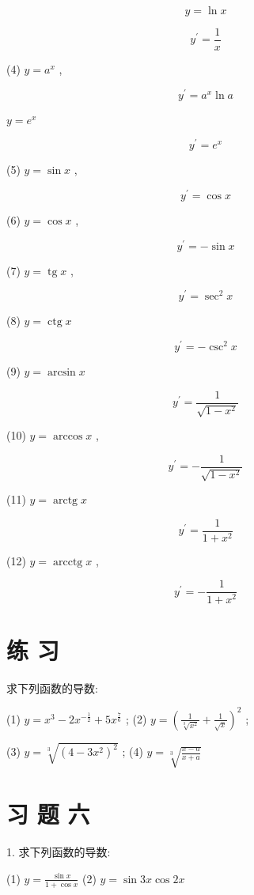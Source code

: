 \documentclass[10pt]{article}
\begin{document}
\[
y = \ln x
\]

\[
{y}^{\prime } = \frac{1}{x}
\]

(4) \(y = {a}^{x}\) ,

\[
{y}^{\prime } = {a}^{x}\ln a
\]

\(y = {e}^{x}\)

\[
{y}^{\prime } = {e}^{x}
\]

(5) \(y = \sin x\) ,

\[
{y}^{\prime } = \cos x
\]

(6) \(y = \cos x\) ,

\[
{y}^{\prime } = - \sin x
\]

(7) \(y = \operatorname{tg}x\) ,

\[
{y}^{\prime } = {\sec }^{2}x
\]

(8) \(y = \operatorname{ctg}x\)

\[
{y}^{\prime } = - {\csc }^{2}x
\]

(9) \(y = \arcsin x\)

\[
{y}^{\prime } = \frac{1}{\sqrt{1 - {x}^{2}}}
\]

(10) \(y = \arccos x\) ,

\[
{y}^{\prime } = - \frac{1}{\sqrt{1 - {x}^{2}}}
\]

(11) \(y = \operatorname{arctg}x\)

\[
{y}^{\prime } = \frac{1}{1 + {x}^{2}}
\]

(12) \(y = \operatorname{arcctg}x\) ,

\[
{y}^{\prime } = - \frac{1}{1 + {x}^{2}}
\]

\section*{练 习}

求下列函数的导数:

(1) \(y = {x}^{3} - 2{x}^{-\frac{1}{2}} + 5{x}^{\frac{7}{6}}\) ; (2) \(y = {\left( \frac{1}{\sqrt[3]{{x}^{2}}} + \frac{1}{\sqrt{x}}\right) }^{2}\) ;

(3) \(y = \sqrt[3]{{\left( 4 - 3{x}^{2}\right) }^{2}}\) ; (4) \(y = \sqrt[3]{\frac{x - a}{x + a}}\)

\section*{习 题 六}

1. 求下列函数的导数:

(1) \(y = \frac{\sin x}{1 + \cos x}\) (2) \(y = \sin {3x}\cos {2x}\)
\end{document}
